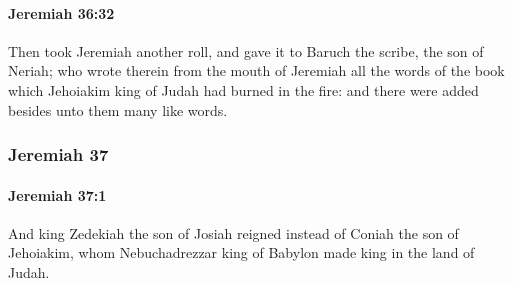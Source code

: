 		\paragraph{Jeremiah 36:32} %
			\label{JEREMIAH-36-32}

			Then took Jeremiah another roll, and gave it to Baruch the scribe, the son of Neriah; who wrote therein from the mouth of Jeremiah all the words of the book which Jehoiakim king of Judah had burned in the fire: and there were added besides unto them many like words.

	\subsubsection{Jeremiah 37} %
		\label{JEREMIAH-37}

		\paragraph{Jeremiah 37:1} %
			\label{JEREMIAH-37-1}

			And king Zedekiah the son of Josiah reigned instead of Coniah the son of Jehoiakim, whom Nebuchadrezzar king of Babylon made king in the land of Judah.


